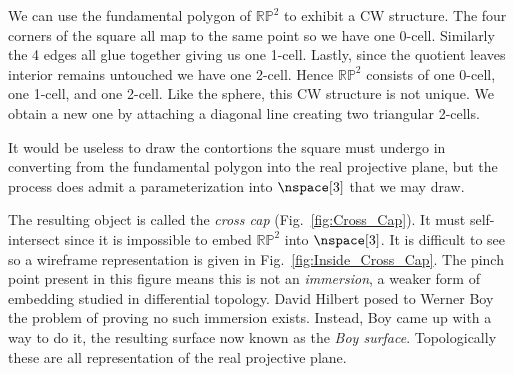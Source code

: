\documentclass{book}                                                           %
\begin{document}
            \hfill
            \begin{minipage}[t]{0.54\textwidth}
                \begin{example}
                    We can use the fundamental polygon of $\mathbb{RP}^{2}$ to
                    exhibit a CW structure. The four corners of the square all
                    map to the same point so we have one 0-cell. Similarly the
                    4 edges all glue together giving us one 1-cell. Lastly,
                    since the quotient leaves interior remains untouched we have
                    one 2-cell. Hence $\mathbb{RP}^{2}$ consists of one 0-cell,
                    one 1-cell, and one 2-cell. Like the sphere, this CW
                    structure is not unique. We obtain a new one by attaching
                    a diagonal line creating two triangular 2-cells.
                \end{example}
            \end{minipage}
            \par\vspace{2.5ex}
            It would be useless to draw the contortions the square
            must undergo in converting from the fundamental polygon into
            the real projective plane, but the process does admit a
            parameterization into $\nspace[3]$ that we may draw.
            \par\hfill\par
            \begin{minipage}[t]{0.54\textwidth}
                The resulting object is called the \textit{cross cap}
                (Fig.~\ref{fig:Cross_Cap}). It must self-intersect since it is
                impossible to embed $\mathbb{RP}^{2}$ into $\nspace[3]$. It
                is difficult to see so a wireframe representation is given in
                Fig.~\ref{fig:Inside_Cross_Cap}. The pinch point present in this
                figure means this is not an \textit{immersion}, a weaker form of
                embedding studied in differential topology. David Hilbert
                posed to Werner Boy the problem of proving no such
                immersion exists. Instead, Boy came up with a way to do it, the
                resulting surface now known as the \textit{Boy surface}.
                Topologically these are all representation of the real
                projective plane.
            \end{minipage}
            \hfill
\end{document}
